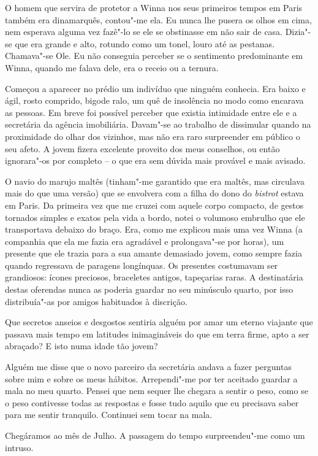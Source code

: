 O homem que servira de protetor a Winna nos seus primeiros tempos em
Paris também era dinamarquês, contou"-me ela. Eu nunca lhe pusera os olhos em cima, nem esperava alguma vez
fazê"-lo se ele se obstinasse em não sair de casa. Dizia"-se que era
grande e alto, rotundo como um tonel, louro até as pestanas. Chamava"-se
Ole. Eu não conseguia perceber se o sentimento predominante em Winna,
quando me falava dele, era o receio ou a ternura.

Começou a aparecer no prédio um indivíduo que ninguém conhecia. Era
baixo e ágil, rosto comprido, bigode ralo, um quê de insolência no modo
como encarava as pessoas. Em breve foi possível perceber que existia
intimidade entre ele e
a secretária da agência imobiliária. Davam"-se ao trabalho de dissimular
quando na proximidade do olhar dos vizinhos, mas não era raro
surpreender em público o seu afeto. A jovem fizera excelente proveito
dos meus conselhos, ou então ignorara"-os por completo -- o que era sem
dúvida mais provável e mais avisado.

O navio do marujo maltês (tinham"-me garantido que era maltês, mas
circulava mais do que uma versão) que se envolvera com a filha do dono
do \emph{bistrot }estava em Paris. Da primeira vez que me cruzei com
aquele corpo compacto, de gestos tornados simples e exatos pela vida
a bordo, notei o volumoso embrulho que ele transportava debaixo do
braço. Era, como me explicou mais uma vez Winna (a companhia que ela me
fazia era agradável e prolongava"-se por horas), um presente que ele
trazia para a sua amante demasiado jovem, como sempre fazia quando
regressava de paragens longínquas. Os presentes costumavam ser
grandiosos: ícones preciosos, braceletes antigos, tapeçarias raras. A
destinatária destas oferendas nunca as poderia guardar no seu minúsculo
quarto, por isso distribuía"-as por amigos habituados à discrição.

Que secretos anseios e desgostos sentiria alguém por amar um eterno
viajante que passava mais tempo em latitudes inimagináveis do que em
terra firme, apto a ser abraçado? E isto numa idade tão jovem?

Alguém me disse que o novo parceiro da secretária andava a fazer
perguntas sobre mim e sobre os meus hábitos. Arrependi"-me por ter
aceitado guardar a mala no meu quarto. Pensei que nem sequer lhe chegara
a sentir o peso, como se o peso contivesse todas as respostas e fosse
tudo aquilo que eu precisava saber para me sentir tranquilo. Continuei
sem tocar na mala.

Chegáramos ao mês de Julho. A passagem do tempo surpreendeu"-me como um
intruso.

